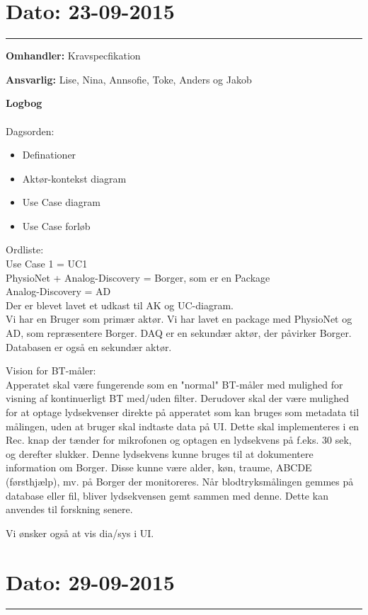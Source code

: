 \section{Dato: 23-09-2015 }
\hrule

\textbf{Omhandler:} Kravspecfikation 

\textbf{Ansvarlig:} Lise, Nina, Annsofie, Toke, Anders og Jakob

\textbf{Logbog}
\\
\\
Dagsorden:
\begin{itemize}
	\item Definationer
	\item Aktør-kontekst diagram
	\item Use Case diagram
	\item Use Case forløb
\end{itemize}

Ordliste:\\ 
Use Case 1 = UC1 \\
PhysioNet + Analog-Discovery = Borger, som er en Package \\
Analog-Discovery = AD \\


Der er blevet lavet et udkast til AK og UC-diagram. \\
Vi har en Bruger som primær aktør. Vi har lavet en package med PhysioNet og AD, som repræsentere Borger. DAQ er en sekundær aktør, der påvirker Borger. Databasen er også en sekundær aktør. 


Vision for BT-måler:\\
Apperatet skal være fungerende som en "normal" BT-måler med mulighed for visning af kontinuerligt BT med/uden filter. Derudover skal der være mulighed for at optage lydsekvenser direkte på apperatet som kan bruges som metadata til målingen, uden at bruger skal indtaste data på UI. Dette skal implementeres i en Rec. knap der tænder for mikrofonen og optagen en lydsekvens på f.eks. 30 sek, og derefter slukker. Denne lydsekvens kunne bruges til at dokumentere information om Borger. Disse kunne være alder, køn, traume, ABCDE (førsthjælp), mv. på Borger der monitoreres. 
Når blodtryksmålingen gemmes på database eller fil, bliver lydsekvensen gemt sammen med denne. Dette kan anvendes til forskning senere. 


Vi ønsker også at vis dia/sys i UI. 

\section{Dato: 29-09-2015 }
\hrule

